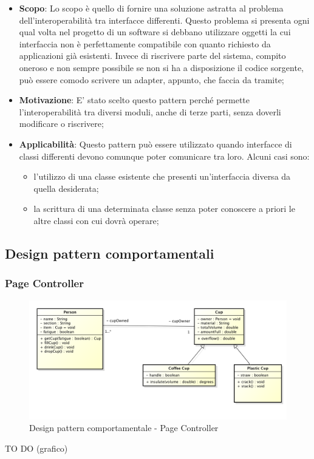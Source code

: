		
		\begin{itemize}
			\item \textbf{Scopo}: Lo scopo è quello di fornire una soluzione astratta al problema dell'interoperabilità tra interfacce differenti. Questo problema si presenta ogni qual volta nel progetto di un software si debbano utilizzare oggetti la cui interfaccia non è perfettamente compatibile con quanto richiesto da applicazioni già esistenti. Invece di riscrivere parte del sistema, compito oneroso e non sempre possibile se non si ha a disposizione il codice sorgente, può essere comodo scrivere un adapter, appunto, che faccia da tramite;
			
			\item \textbf{Motivazione}: E' stato scelto questo pattern perché permette l'interoperabilità tra diversi moduli, anche di terze parti, senza doverli modificare o riscrivere;
			
			\item \textbf{Applicabilità}: Questo pattern può essere utilizzato quando interfacce di classi differenti devono comunque poter comunicare tra loro. Alcuni casi sono:
			
			\begin{itemize}
			\item l'utilizzo di una classe esistente che presenti un'interfaccia diversa da quella desiderata;
			\item la scrittura di una determinata classe senza poter conoscere a priori le altre classi con cui dovrà operare;
			\end{itemize}
		
		\end{itemize}




	\clearpage 
	\newpage
	\subsection{Design pattern comportamentali} %
		\subsubsection{Page Controller} %
		
		
		\begin{figure}[htbp]
			\centering
			\centerline{\includegraphics[scale=0.3]{./images/example_graph.png}}
			\caption{Design pattern comportamentale - Page Controller}
		\end{figure}
		TO DO (grafico)
		
